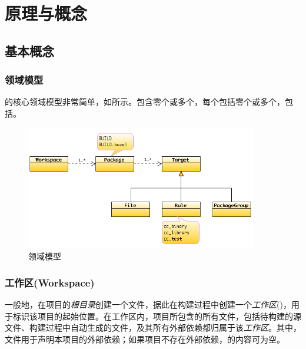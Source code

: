 \begin{savequote}[45mm]
\end{savequote}

\chapter{原理与概念} 
\label{ch:bazel-concept}

\section{基本概念}

\begin{content}

\subsection{领域模型}

的核心领域模型非常简单，如所示。包含零个或多个，每个包括零个或多个，包括。
 
\begin{figure}[H]
\centering
\includegraphics[width=0.9\textwidth]{figures/bazel-domain-model.png}
\caption{领域模型}
 \label{fig:bazel-domain-model}
\end{figure}

\subsection{工作区(Workspace)}

一般地，在项目的\emph{根目录}创建一个文件，据此在构建过程中创建一个\emph{工作区}()，用于标识该项目的起始位置。在工作区内，项目所包含的所有文件，包括待构建的源文件、构建过程中自动生成的文件，及其所有外部依赖都归属于该\emph{工作区}。其中，文件用于声明本项目的外部依赖；如果项目不存在外部依赖，的内容可为空。


\end{content}
